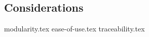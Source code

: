 \documentclass{article}
\begin{document}
\subsection{Considerations}

{modularity.tex}
{ease-of-use.tex}
{traceability.tex}
\end{document}
